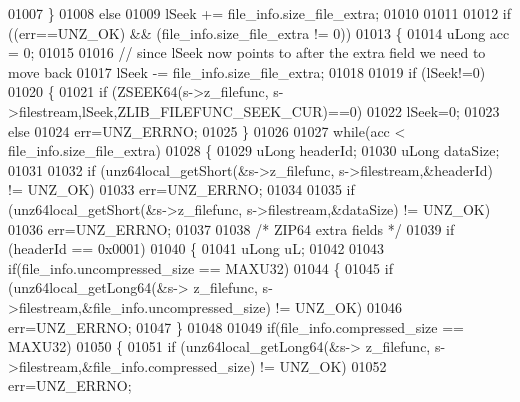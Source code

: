 \begin{DoxyCode}
01007     \}
01008     \textcolor{keywordflow}{else}
01009         lSeek += file\_info.size\_file\_extra;
01010 
01011 
01012     \textcolor{keywordflow}{if} ((err==UNZ\_OK) && (file\_info.size\_file\_extra != 0))
01013     \{
01014                                 uLong acc = 0;
01015 
01016         \textcolor{comment}{// since lSeek now points to after the extra field we need to move back}
01017         lSeek -= file\_info.size\_file\_extra;
01018 
01019         \textcolor{keywordflow}{if} (lSeek!=0)
01020         \{
01021             \textcolor{keywordflow}{if} (ZSEEK64(s->z\_filefunc, s->filestream,lSeek,ZLIB\_FILEFUNC\_SEEK\_CUR)==0)
01022                 lSeek=0;
01023             \textcolor{keywordflow}{else}
01024                 err=UNZ\_ERRNO;
01025         \}
01026 
01027         \textcolor{keywordflow}{while}(acc < file\_info.size\_file\_extra)
01028         \{
01029             uLong headerId;
01030                                                 uLong dataSize;
01031 
01032             \textcolor{keywordflow}{if} (unz64local\_getShort(&s->z\_filefunc, s->filestream,&headerId) != UNZ\_OK)
01033                 err=UNZ\_ERRNO;
01034 
01035             \textcolor{keywordflow}{if} (unz64local\_getShort(&s->z\_filefunc, s->filestream,&dataSize) != UNZ\_OK)
01036                 err=UNZ\_ERRNO;
01037 
01038             \textcolor{comment}{/* ZIP64 extra fields */}
01039             \textcolor{keywordflow}{if} (headerId == 0x0001)
01040             \{
01041                                                         uLong uL;
01042 
01043                                                                 \textcolor{keywordflow}{if}(file\_info.uncompressed\_size == MAXU32)
01044                                                                 \{
01045                                                                         \textcolor{keywordflow}{if} (unz64local\_getLong64(&s->
      z\_filefunc, s->filestream,&file\_info.uncompressed\_size) != UNZ\_OK)
01046                                                                                         err=UNZ\_ERRNO;
01047                                                                 \}
01048 
01049                                                                 \textcolor{keywordflow}{if}(file\_info.compressed\_size == MAXU32)
01050                                                                 \{
01051                                                                         \textcolor{keywordflow}{if} (unz64local\_getLong64(&s->
      z\_filefunc, s->filestream,&file\_info.compressed\_size) != UNZ\_OK)
01052                                                                                   err=UNZ\_ERRNO;

\end{DoxyCode}
